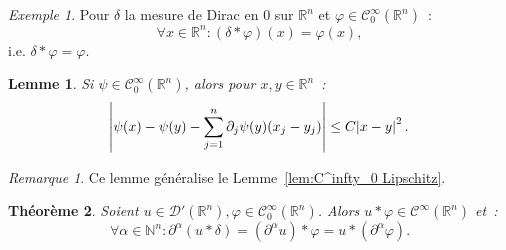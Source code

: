 \documentclass{report}
\newcommand{\R}{{\mathbb R}}
\newcommand{\N}{{\mathbb N}}
\newtheorem{thm}{Théorème}[chapter]
\newtheorem{lem}[thm]{Lemme}
\theoremstyle{definition}
\theoremstyle{remark}
\newtheorem*{rmq}{Remarque}
\newtheorem{ex}{Exemple}[chapter]
\begin{document}
\begin{ex} Pour $\delta$ la mesure de Dirac en 0 sur $\R^n$ et $\varphi \in \mathcal C^\infty_0(\R^n)$~:
\[\forall x \in \R^n : (\delta * \varphi)(x) = \varphi(x),\]
i.e. $\delta * \varphi = \varphi$.
\end{ex}

\begin{lem}\label{lem:C^infty_0 Lipschitz^2} Si $\psi \in \mathcal C^\infty_0(\R^n)$, alors pour $x, y \in \R^n$~:
\[\abs {\psi(x) - \psi(y) - \sum_{j=1}^n\partial_j\psi(y)(x_j-y_j)} \leq C\abs {x-y}^2.\]
\end{lem}

\begin{rmq} Ce lemme généralise le Lemme~\ref{lem:C^infty_0 Lipschitz}.
\end{rmq}

\begin{thm} Soient $u \in \mathcal D'(\R^n), \varphi \in \mathcal C^\infty_0(\R^n)$. Alors $u * \varphi \in \mathcal C^\infty(\R^n)$ et~:
\[\forall \alpha \in \N^n : \partial^\alpha(u * \delta) = (\partial^\alpha u) * \varphi = u * (\partial^\alpha\varphi).\]
\end{thm}
\end{document}
